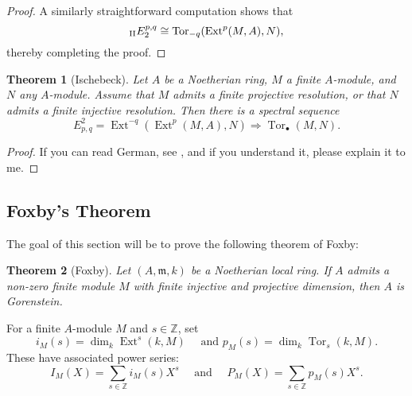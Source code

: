 \documentclass[11pt]{article}
\theoremstyle{thmstyle}
\newtheorem{theorem}{Theorem}
\theoremstyle{defstyle}
\newcommand{\Z}{\mathbb{Z}}
\newcommand{\Tor}{\operatorname{Tor}}
\newcommand{\frakm}{\mathfrak{m}} %
\newcommand{\Ext}{\operatorname{Ext}}
\begin{document}
\begin{proof}
    A similarly straightforward computation shows that 
    \begin{equation*}
        {}_{\rm II}E^{p, q}_2\cong\Tor_{-q}(\Ext^p(M, A), N),
    \end{equation*}
    thereby completing the proof.
\end{proof}

\begin{theorem}[Ischebeck]
    Let $A$ be a Noetherian ring, $M$ a finite $A$-module, and $N$ any $A$-module. Assume that $M$ admits a finite projective resolution, or that $N$ admits a finite injective resolution. Then there is a spectral sequence 
    \begin{equation*}
        E^2_{p, q} = \Ext^{-q}\left(\Ext^p(M, A), N\right)\Longrightarrow\Tor_\bullet(M, N).
    \end{equation*}
\end{theorem}
\begin{proof}
    If you can read German, see \cite{ischebeck-tor-ext}, and if you understand it, please explain it to me.
\end{proof}

\subsection*{Foxby's Theorem}

The goal of this section will be to prove the following theorem of Foxby:

\begin{theorem}[Foxby]
    Let $(A,\frakm, k)$ be a Noetherian local ring. If $A$ admits a non-zero finite module $M$ with finite injective and projective dimension, then $A$ is Gorenstein.
\end{theorem}

For a finite $A$-module $M$ and $s\in\Z$, set
\begin{equation*}
    i_M(s) = \dim_k \Ext^s(k, M)\quad\text{ and } p_M(s) = \dim_k \Tor_s(k, M).
\end{equation*}
These have associated power series: 
\begin{equation*}
    I_M(X) = \sum_{s\in\Z} i_M(s)X^s\quad\text{ and }\quad P_M(X) = \sum_{s\in\Z} p_M(s)X^s.
\end{equation*}
\end{document}
